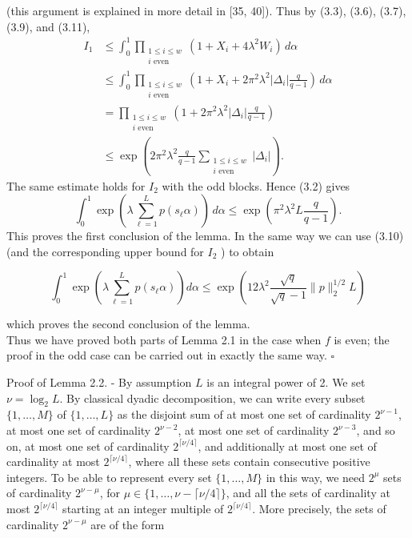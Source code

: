 \documentclass[10pt]{article}
\newcommand{\1}{\mathbf{1}}
\begin{document}
(this argument is explained in more detail in [35, 40]). Thus by (3.3), (3.6), (3.7), (3.9), and (3.11),
\begin{align*}
I_1
&\leqslant\int_0^1
 \prod_{\substack{1\leqslant i\leqslant w\\i\text{ even}}}
 \left(1+X_i+4\lambda^2W_i\right)\,d\alpha\\
&\leqslant\int_0^1
 \prod_{\substack{1\leqslant i\leqslant w\\i\text{ even}}}
 \left(1+X_i+2\pi^2\lambda^2|\Delta_i|\frac{q}{q-1}\right)\,d\alpha\\
&=\prod_{\substack{1\leqslant i\leqslant w\\i\text{ even}}}
 \left(1+2\pi^2\lambda^2|\Delta_i|\frac{q}{q-1}\right)\\
&\leqslant\exp\left(
 2\pi^2\lambda^2\frac{q}{q-1}
 \sum_{\substack{1\leqslant i\leqslant w\\i\text{ even}}}|\Delta_i|
 \right).
\end{align*}
The same estimate holds for $I_2$ with the odd blocks.  Hence (3.2) gives
\[
\int_0^1\exp\left(\lambda\sum_{\ell=1}^{L}p(s_\ell\alpha)\right)\,d\alpha
 \leqslant\exp\left(\pi^2\lambda^2L\frac{q}{q-1}\right).
\]
This proves the first conclusion of the lemma. In the same way we can use (3.10) (and the corresponding upper bound for $I_{2}$ ) to obtain

$$
\int_{0}^{1} \exp \left(\lambda \sum_{\ell=1}^{L} p\left(s_{\ell} \alpha\right)\right) d \alpha \leqslant \exp \left(12\lambda^2\frac{\sqrt q}{\sqrt q-1}\|p\|_2^{1/2}L\right)
$$

which proves the second conclusion of the lemma.\\
Thus we have proved both parts of Lemma 2.1 in the case when $f$ is even; the proof in the odd case can be carried out in exactly the same way. \(\square\)

Proof of Lemma 2.2. - By assumption $L$ is an integral power of 2. We set $\nu=\log _{2} L$. By classical dyadic decomposition, we can write every subset $\{1, \ldots, M\}$ of $\{1, \ldots, L\}$ as the disjoint sum of at most one set of cardinality $2^{\nu-1}$, at most one set of cardinality $2^{\nu-2}$, at most one set of cardinality $2^{\nu-3}$, and so on, at most one set of cardinality $2^{\lceil\nu / 4\rceil}$, and additionally at most one set of cardinality at most $2^{\lceil\nu / 4\rceil}$, where all these sets contain consecutive positive integers. To be able to represent every set $\{1, \ldots, M\}$ in this way, we need $2^{\mu}$ sets of cardinality $2^{\nu-\mu}$, for $\mu \in\{1, \ldots, \nu-\lceil\nu / 4\rceil\}$, and all the sets of cardinality at most $2^{\lceil\nu / 4\rceil}$ starting at an integer multiple of $2^{\lceil\nu / 4\rceil}$. More precisely, the sets of cardinality $2^{\nu-\mu}$ are of the form
\end{document}
